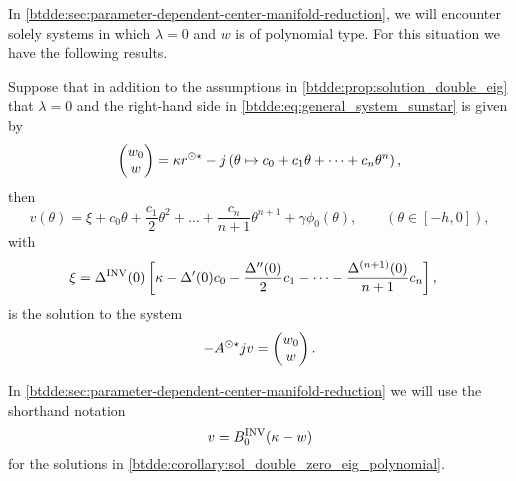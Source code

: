 In \cref{btdde:sec:parameter-dependent-center-manifold-reduction}, we will encounter
solely systems in which $\lambda=0$ and $w$ is of polynomial type. For this
situation we have the following results.

\begin{corollary}
\label{btdde:corollary:sol_double_zero_eig_polynomial} 
Suppose that in addition to the assumptions in \cref{btdde:prop:solution_double_eig} that $\lambda = 0$ and the right-hand side in \cref{btdde:eq:general_system_sunstar} is given by
\[
\begin{pmatrix}
w_0 \\ w
\end{pmatrix}
=
\kappa r^{\odot\star} - j\left(\theta \mapsto c_0 + c_1 \theta + \dots + c_n \theta^n\right),
\]
then
\[
    v(\theta) = \xi + c_0 \theta + \frac{c_1}2 \theta^2 + \dots + \frac{c_n}{n + 1} \theta^{n + 1} + \gamma \phi_0(\theta), 
                \qquad\left(\theta\in[-h,0]\right),
\]
with
\begin{align*}
    \xi & = \Delta^{\mathrm{INV}}(0)\left[\kappa - \Delta'(0) c_0  - \frac{\Delta''(0)}2 c_1 - \dots - \frac{\Delta^{(n + 1)}(0)}{n + 1} c_n \right],
\end{align*}
is the solution to the system
\[
-A^{\odot\star} j v  = 
\begin{pmatrix}
w_0 \\ w
\end{pmatrix}.
\]
\end{corollary}

\begin{remark}
In \cref{btdde:sec:parameter-dependent-center-manifold-reduction} we will use the shorthand notation
\[
    v = B^{\mathrm{INV}}_{0} (\kappa - w)
\]
for the solutions in \cref{btdde:corollary:sol_double_zero_eig_polynomial}.
\end{remark}

